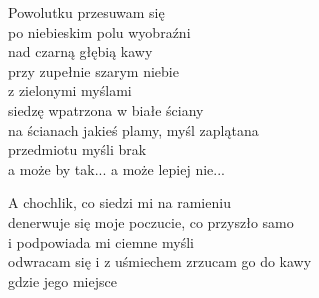 \begin{text}
    Powolutku przesuwam się\\
    po niebieskim polu wyobraźni\\
    nad czarną głębią kawy\\
    przy zupełnie szarym niebie\\
    z zielonymi myślami\\
    siedzę wpatrzona w białe ściany\\
    na ścianach jakieś plamy, myśl zaplątana\\
    przedmiotu myśli brak\\
    a może by tak... a może lepiej nie...

    A chochlik, co siedzi mi na ramieniu\\
    denerwuje się moje poczucie, co przyszło samo\\
    i podpowiada mi ciemne myśli\\
    odwracam się i z uśmiechem zrzucam go do kawy\\
    gdzie jego miejsce
\end{text}
\begin{chord}

\end{chord}